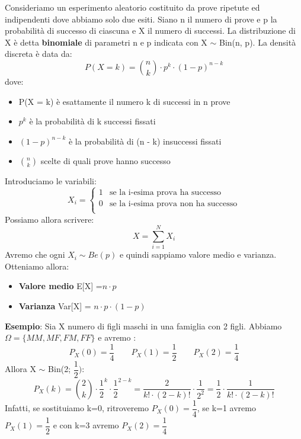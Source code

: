 Consideriamo un esperimento aleatorio costituito da prove ripetute ed indipendenti dove abbiamo solo due esiti. Siano n il numero di prove e p la probabilità di successo di ciascuna e X il numero di successi. \newline La distribuzione di X è detta \textbf{binomiale} di parametri n e p indicata con \newline X $\sim$ Bin(n, p).  La densità discreta è data da: $$ P(X = k) = \binom{n}{k} \cdot p^k \cdot (1 -p)^{n - k} $$
dove:
\begin{itemize}
    \item P(X = k) è esattamente il numero k di successi in n prove
    \item $p^k$ è la probabilità di k successi fissati
    \item $(1 - p)^{n-k}$ è la probabilità di (n - k) insuccessi fissati
    \item $\binom{n}{k}$ scelte di quali prove hanno successo
\end{itemize}
\noindent Introduciamo le variabili:
\begin{equation}
  X_i =
    \begin{cases}
      1 & \text{se la i-esima prova ha successo}\\
      0 & \text{se la i-esima prova non ha successo}\\
    \end{cases}       
\end{equation}
Possiamo allora scrivere: $$ X = \sum_{i=1}^{N} X_i$$
Avremo che ogni $X_i \sim Be(p)$ e quindi sappiamo valore medio e varianza. Otteniamo allora:
\begin{itemize}
    \item \textbf{Valore medio} E[X] =$ n \cdot p$
    \item \textbf{Varianza} Var[X] = $n \cdot p \cdot (1 - p)$
\end{itemize}

\begin{tcolorbox}
    \textbf{Esempio}: Sia X numero di figli maschi in una famiglia con 2 figli.  
    Abbiamo $\Omega = \{MM, MF, FM, FF\}$ e avremo : $$P_X(0) = {\dfrac{1}{4}}  \qquad P_X(1) = {\dfrac{1}{2}} \qquad P_X(2) = {\dfrac{1}{4}}$$
    Allora X $\sim$ Bin(2; $\dfrac{1}{2})$: $$P_X(k)= \binom{2}{k} \cdot \dfrac{1}{2}^k \cdot \dfrac{1}{2}^{2 - k}= \dfrac{2}{k! \cdot (2 - k)!} \cdot \dfrac{1}{2^2} = \dfrac{1}{2} \cdot \dfrac{1}{k! \cdot (2-k)!} $$
    Infatti, se sostituiamo k=0, ritroveremo $P_X(0) = \dfrac{1}{4}$, se k=1 avremo $P_X(1) = \dfrac{1}{2}$ e con k=3 avremo $P_X(2) = \dfrac{1}{4}$
\end{tcolorbox}

